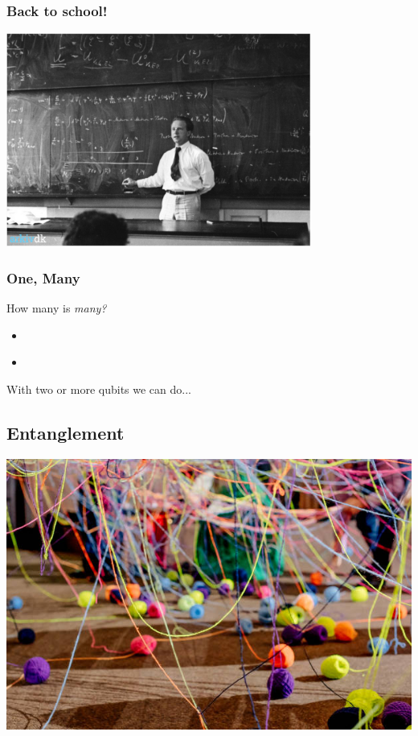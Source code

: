 \documentclass[10pt]{beamer}
\begin{document}
\begin{frame}
  \frametitle{Back to school!}
  \centering
  \includegraphics[width=10cm]{img/back-to-school.png}
\end{frame}
\begin{frame}
  \frametitle{One, Many}
  How many is \emph{many?}
  \begin{itemize}
  \item<2->   
  \end{itemize}
  \begin{itemize}
  \item<7->  
  \end{itemize}

   {With two or more qubits we can do...}
\end{frame}

\begin{frame}
  \section{Entanglement}
  \centering
  \includegraphics[width=0.7\linewidth]{img/tangled-yarn.jpg}
\end{frame}
\end{document}
